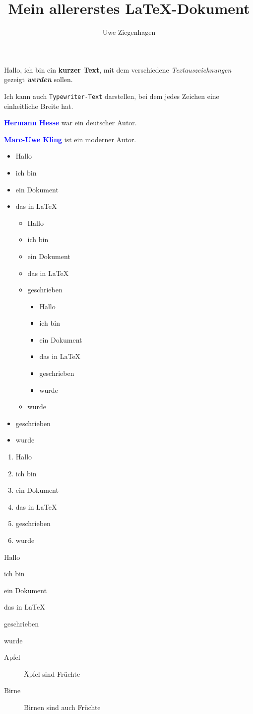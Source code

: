 \documentclass[ngerman,12pt,parskip=half]{scrartcl}
\author{Uwe Ziegenhagen}
\title{Mein allererstes \LaTeX-Dokument}
\newcommand{\autor}[1]{\textbf{\textcolor{blue}{#1}}}
\begin{document}
Hallo, ich bin ein \textbf{kurzer Text}, mit dem verschiedene \textit{Textauszeichnungen} gezeigt \textbf{\textit{werden }} sollen. 

Ich kann auch \texttt{Typewriter-Text} darstellen, bei dem jedes Zeichen eine einheitliche Breite hat.

\autor{Hermann Hesse} war ein deutscher Autor.

\autor{Marc-Uwe Kling} ist ein moderner Autor.

\begin{itemize}
	\item Hallo
	\item ich bin 
	\item ein Dokument
	\item das in \LaTeX 
	
	\begin{itemize}
		\item Hallo
		\item ich bin 
		\item ein Dokument
		\item das in \LaTeX
		\item geschrieben
		
		\begin{itemize}
			\item Hallo
			\item ich bin 
			\item ein Dokument
			\item das in \LaTeX
			\item geschrieben
			\item wurde
		\end{itemize}
		
		\item wurde
	\end{itemize}
	
	
	\item geschrieben
	\item wurde
\end{itemize}

\begin{enumerate}
	\item Hallo
	\item ich bin 
	\item ein Dokument
	\item das in \LaTeX
	\item geschrieben
	\item wurde
\end{enumerate}

\begin{compactenum}[i]
	\item Hallo
	\item ich bin 
	\item ein Dokument
	\item das in \LaTeX
	\item geschrieben
	\item wurde
\end{compactenum}


\begin{description}
	\item[Apfel] Äpfel sind Früchte
	\item[Birne] Birnen sind auch Früchte
\end{description}
\end{document}
